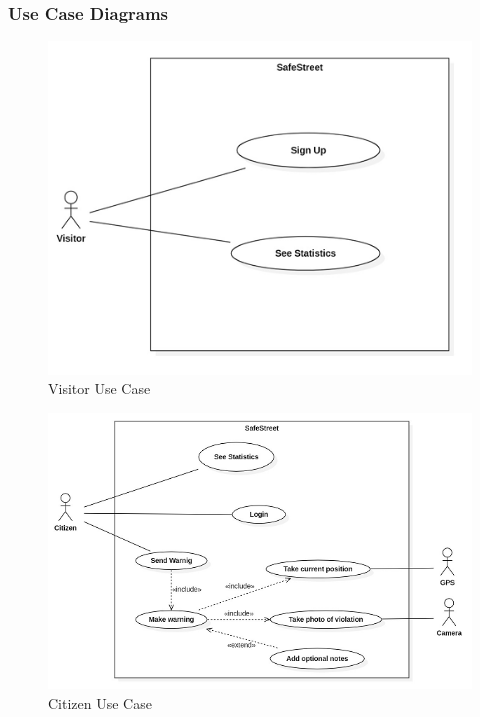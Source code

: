 \subsubsection{Use Case Diagrams}
\begin{figure}[h]
\centering
\includegraphics{Images/usecase_visitor.png}
\caption{\label{fig:VUC}Visitor Use Case }
\end{figure}
\begin{figure}[h]
\centering
\includegraphics[width=\textwidth]{Images/usecase_citizen.png}
\caption{\label{fig:CUC}Citizen Use Case }
\end{figure}
